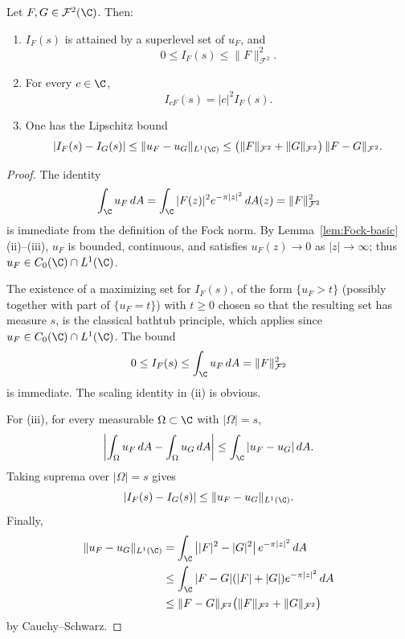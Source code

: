 \begin{lemma}\label{lem:basic-properties-global}
Let \(F,G\in \mathcal F^2(\C)\). Then:
\begin{enumerate}
    \item[(i)] \(I_F(s)\) is attained by a superlevel set of \(u_F\), and
    \[
    0\le I_F(s)\le \|F\|_{\mathcal F^2}^2.
    \]
    \item[(ii)] For every \(c\in \C\),
    \[
    I_{cF}(s)=|c|^2 I_F(s).
    \]
    \item[(iii)] One has the Lipschitz bound
    \[
    |I_F(s)-I_G(s)|
    \le
    \|u_F-u_G\|_{L^1(\C)}
    \le
    \big(\|F\|_{\mathcal F^2}+\|G\|_{\mathcal F^2}\big)\,
    \|F-G\|_{\mathcal F^2}.
    \]
\end{enumerate}
\end{lemma}

\begin{proof}
The identity
\[
\int_\C u_F\,dA=\int_\C |F(z)|^2e^{-\pi |z|^2}\,dA(z)=\|F\|_{\mathcal F^2}^2
\]
is immediate from the definition of the Fock norm. By
Lemma~\ref{lem:Fock-basic}(ii)--(iii), \(u_F\) is bounded, continuous, and
satisfies \(u_F(z)\to 0\) as \(|z|\to\infty\); thus
\(u_F\in C_0(\C)\cap L^1(\C)\).

The existence of a maximizing set for \(I_F(s)\), of the form
\(\{u_F>t\}\) (possibly together with part of \(\{u_F=t\}\)) with \(t\geq 0\)
chosen so that the resulting set has measure \(s\), is the classical bathtub
principle, which applies since \(u_F\in C_0(\C)\cap L^1(\C)\). The bound
\[
0\le I_F(s)\le \int_\C u_F\,dA=\|F\|_{\mathcal F^2}^2
\]
is immediate. The scaling identity in (ii) is obvious.

For (iii), for every measurable \(\Omega\subset \C\) with \(|\Omega|=s\),
\[
\left|\int_\Omega u_F\,dA-\int_\Omega u_G\,dA\right|
\le \int_\C |u_F-u_G|\,dA.
\]
Taking suprema over \(|\Omega|=s\) gives
\[
|I_F(s)-I_G(s)|\le \|u_F-u_G\|_{L^1(\C)}.
\]
Finally,
\begin{align*}
\|u_F-u_G\|_{L^1(\C)}
&=
\int_\C \big||F|^2-|G|^2\big|\,e^{-\pi |z|^2}\,dA \\
&\le
\int_\C |F-G|(|F|+|G|)e^{-\pi |z|^2}\,dA \\
&\le
\|F-G\|_{\mathcal F^2}\big(\|F\|_{\mathcal F^2}+\|G\|_{\mathcal F^2}\big)
\end{align*}
by Cauchy--Schwarz.
\end{proof}

